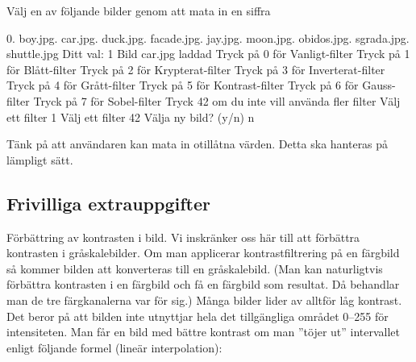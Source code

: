 {\setlength{\parindent}{0cm}

 Välj en av följande bilder genom att mata in en siffra\newline

0. boy.jpg. car.jpg. duck.jpg. facade.jpg. jay.jpg. moon.jpg. obidos.jpg. sgrada.jpg. shuttle.jpg\newline
Ditt val: 1\newline
Bild car.jpg laddad\newline
Tryck på 0 för Vanligt-filter\newline
Tryck på 1 för Blått-filter\newline
Tryck på 2 för Krypterat-filter\newline
Tryck på 3 för Inverterat-filter\newline
Tryck på 4 för Grått-filter\newline
Tryck på 5 för Kontrast-filter\newline
Tryck på 6 för Gauss-filter\newline
Tryck på 7 för Sobel-filter\newline
Tryck 42 om du inte vill använda fler filter\newline
Välj ett filter 1\newline
Välj ett filter 42\newline
Välja ny bild? (y/n) n\newline
}

Tänk på att användaren kan mata in otillåtna värden. Detta ska hanteras på lämpligt sätt.

\subsection{Frivilliga extrauppgifter}

\Task Förbättring av kontrasten i bild. Vi inskränker oss här till att förbättra kontrasten i gråskalebilder. Om man applicerar kontrastfiltrering på en färgbild så kommer bilden att konverteras till en gråskalebild. (Man kan naturligtvis förbättra kontrasten i en färgbild och få en färgbild som resultat. Då behandlar man de tre färgkanalerna var för sig.) Många bilder lider av alltför låg kontrast. Det beror på att bilden inte utnyttjar hela det tillgängliga området 0–255 för intensiteten. Man får en bild med bättre kontrast om man ”töjer ut” intervallet enligt följande formel (lineär interpolation):

